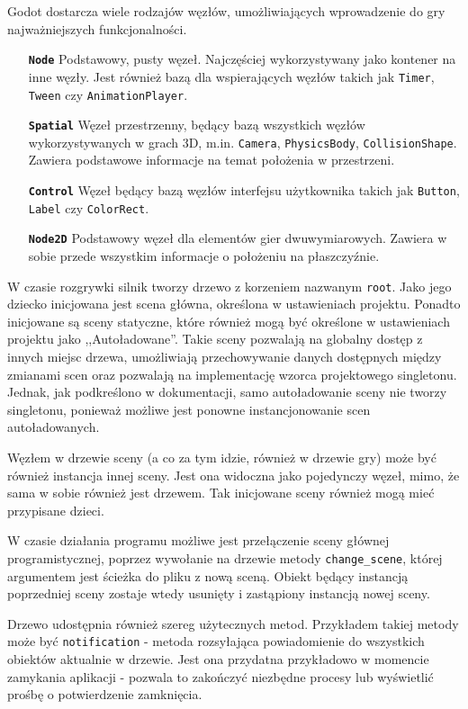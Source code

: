 Godot dostarcza wiele rodzajów węzłów, umożliwiających wprowadzenie do gry najważniejszych funkcjonalności. 

\begin{itemize}
    \item[\textbf{\texttt{Node}}] Podstawowy, pusty węzeł. Najczęściej wykorzystywany jako kontener na inne węzły. Jest również bazą dla wspierających węzłów takich jak \texttt{Timer}, \texttt{Tween} czy \texttt{AnimationPlayer}.
    \item[\textbf{\texttt{Spatial}}] Węzeł przestrzenny, będący bazą wszystkich węzłów wykorzystywanych w grach 3D, m.in. \texttt{Camera}, \texttt{PhysicsBody}, \texttt{CollisionShape}. Zawiera podstawowe informacje na temat położenia w przestrzeni.
    \item[\textbf{\texttt{Control}}] Węzeł będący bazą węzłów interfejsu użytkownika takich jak \texttt{Button}, \texttt{Label} czy \texttt{ColorRect}.
    \item[\textbf{\texttt{Node2D}}] Podstawowy węzeł dla elementów gier dwuwymiarowych. Zawiera w sobie przede wszystkim informacje o położeniu na płaszczyźnie. 
\end{itemize}

W czasie rozgrywki silnik tworzy drzewo z korzeniem nazwanym \texttt{root}. Jako jego dziecko inicjowana jest scena główna, określona w ustawieniach projektu. Ponadto inicjowane są sceny statyczne, które również mogą być określone w ustawieniach projektu jako ,,Autoładowane''. Takie sceny pozwalają na globalny dostęp z innych miejsc drzewa, umożliwiają przechowywanie danych dostępnych między zmianami scen oraz pozwalają na implementację wzorca projektowego singletonu\cite{singleton_refactoring_guru}. Jednak, jak podkreślono w dokumentacji, samo autoładowanie sceny nie tworzy singletonu, ponieważ możliwe jest ponowne instancjonowanie scen autoładowanych. 

Węzłem w drzewie sceny (a co za tym idzie, również w drzewie gry) może być również instancja innej sceny. Jest ona widoczna jako pojedynczy węzeł, mimo, że sama w sobie również jest drzewem. Tak inicjowane sceny również mogą mieć przypisane dzieci.

W czasie działania programu możliwe jest przełączenie sceny głównej programistycznej, poprzez wywołanie na drzewie metody \texttt{change\_scene}, której argumentem jest ścieżka do pliku z nową sceną. Obiekt będący instancją poprzedniej sceny zostaje wtedy usunięty i zastąpiony instancją nowej sceny.

Drzewo udostępnia również szereg użytecznych metod. Przykładem takiej metody może być \texttt{notification} - metoda rozsyłająca powiadomienie do wszystkich obiektów aktualnie w drzewie. Jest ona przydatna przykładowo w momencie zamykania aplikacji - pozwala to zakończyć niezbędne procesy lub wyświetlić prośbę o potwierdzenie zamknięcia.

